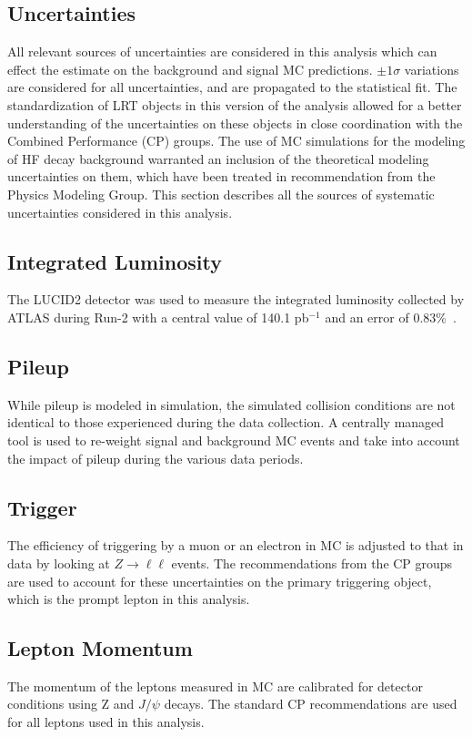 \subsection{Uncertainties}
All relevant sources of uncertainties are considered in this analysis which can effect the estimate on the background and signal MC predictions. $\pm 1 \sigma$ variations are considered for all uncertainties, and are propagated to the statistical fit. The standardization of LRT objects in this version of the analysis allowed for a better understanding of the uncertainties on these objects in close coordination with the Combined Performance (CP) groups. The use of MC simulations for the modeling of HF decay background warranted an inclusion of the theoretical modeling uncertainties on them, which have been treated in recommendation from the Physics Modeling Group. This section describes all the sources of systematic uncertainties considered in this analysis.

\subsection*{Integrated Luminosity}
The LUCID2 detector was used to measure the integrated luminosity collected by ATLAS during Run-2 with a central value of 140.1 pb$^{-1}$ and an error of 0.83\%~\cite{DAPR-2021-01}.

\subsection*{Pileup}
While pileup is modeled in simulation, the simulated collision conditions are not identical to those experienced during the data collection. A centrally managed tool is used to re-weight signal and background MC events and take into account the impact of pileup during the various data periods.

\subsection*{Trigger}
The efficiency of triggering by a muon or an electron in MC is adjusted to that in data by looking at $Z\to\ell\ell$ events. The recommendations from the CP groups are used to account for these uncertainties on the primary triggering object, which is the prompt lepton in this analysis.

\subsection*{Lepton Momentum}
The momentum of the leptons measured in MC are calibrated for detector conditions using Z and $J/\psi$ decays. The standard CP recommendations are used for all leptons used in this analysis.

